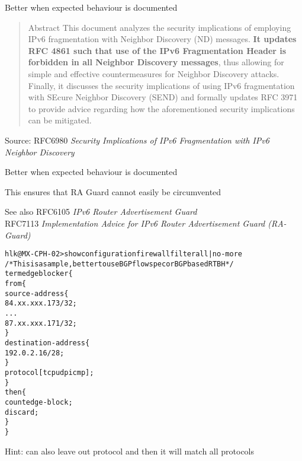 \documentclass[Screen16to9,17pt]{foils}
\begin{document}
\begin{list2}
\item Better when expected behaviour is documented
\end{list2}



\begin{quote}
Abstract
   This document analyzes the security implications of employing IPv6
   fragmentation with Neighbor Discovery (ND) messages. {\bf  It updates RFC
   4861 such that use of the IPv6 Fragmentation Header is forbidden in
   all Neighbor Discovery messages}, thus allowing for simple and
   effective countermeasures for Neighbor Discovery attacks.  Finally,
   it discusses the security implications of using IPv6 fragmentation
   with SEcure Neighbor Discovery (SEND) and formally updates RFC 3971
   to provide advice regarding how the aforementioned security
   implications can be mitigated.
\end{quote}
Source: RFC6980 \emph{Security Implications of IPv6 Fragmentation with IPv6 Neighbor Discovery}

\begin{list2}
\item Better when expected behaviour is documented
\item This ensures that RA Guard cannot easily be circumvented
\item See also RFC6105 \emph{IPv6 Router Advertisement Guard} \\
RFC7113 \emph{Implementation Advice for IPv6 Router Advertisement Guard (RA-Guard)}
\end{list2}





\begin{alltt}\footnotesize
hlk@MX-CPH-02> show configuration firewall filter all | no-more
/* This is a sample, better to use BGP flowspec or BGP based RTBH */
term edgeblocker \{
    from \{
        source-address \{
            84.xx.xxx.173/32;
...
            87.xx.xxx.171/32;
        \}
        destination-address \{
            192.0.2.16/28;
        \}
        protocol [ tcp udp icmp ];
    \}
    then \{
        count edge-block;
        discard;
    \}
\}
\end{alltt}
Hint: can also leave out protocol and then it will match all protocols
\end{document}
